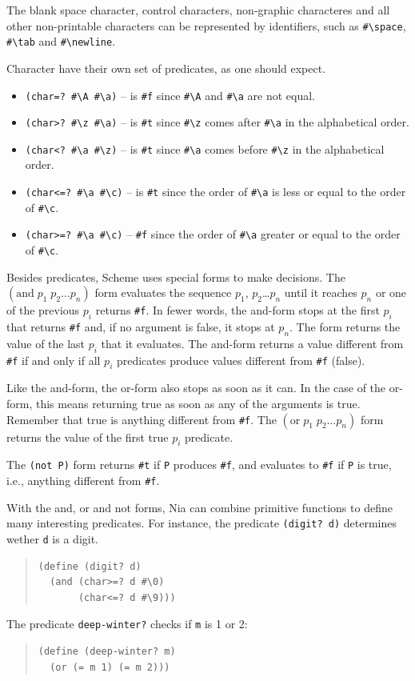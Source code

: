 \documentclass[a4paper,12pt]{book}
\begin{document}
The blank space character,  control
characters, non-graphic characteres
and all other non-printable characters
can be represented by
 identifiers, such as \verb|#\space|,
 \verb|#\tab| and \verb|#\newline|.

 Character have their own set of
 predicates, as one should expect.
\begin{itemize}
\item\verb|(char=? #\A #\a)| -- is \verb|#f|
  since \verb|#\A| and \verb|#\a| are not equal.
\item\verb|(char>? #\z #\a)| -- is \verb|#t|
  since \verb|#\z|  comes
  after \verb|#\a| in the alphabetical order.
\item\verb|(char<? #\a #\z)| -- is \verb|#t|
  since \verb|#\a| comes before \verb|#\z|
  in the alphabetical order.
\item\verb|(char<=? #\a #\c)| -- is \verb|#t| since
  the order of \verb|#\a| is less or equal to
  the order of \verb|#\c|.
\item\verb|(char>=? #\a #\c)| -- \verb|#f| since
  the order of \verb|#\a| greater or equal to the
  order of \verb|#\c|.
\end{itemize}

Besides predicates, Scheme uses special forms
to make decisions. The $(\textrm{and}\; p_1\;
p_2\ldots p_n)$ form
evaluates the sequence $p_1$, $p_2$\ldots $p_n$
until it reaches $p_n$ or one of the previous
$p_i$ returns \verb|#f|. In fewer words,
the and-form stops at the first
$p_i$ that returns \verb|#f| and, if no
argument is false, it stops at $p_n$.
The form returns the value of the last
$p_i$ that it evaluates. The and-form
returns a value different from \verb|#f|
if and only if all $p_i$ predicates produce
values different from \verb|#f| (false).

Like the and-form, the or-form also stops
as soon as it can. In the case of the or-form,
this means returning true as soon as any
of the arguments is true. Remember that
true is anything different from \verb|#f|.
The  $(\textrm{or}\; p_1\;
p_2\ldots p_n)$ form returns the value
of the first true $p_i$ predicate.

The \verb|(not P)| form returns \verb|#t|
if \verb|P| produces \verb|#f|, and
evaluates to \verb|#f| if \verb|P| is true,
i.e., anything different from \verb|#f|.

With the and, or and not forms, Nia can
combine primitive functions to define
many interesting predicates. For instance,
the predicate \verb|(digit? d)| determines
wether \verb|d| is a digit.
\begin{quote}
\begin{verbatim}
(define (digit? d)
  (and (char>=? d #\0)
       (char<=? d #\9)))
\end{verbatim}
\end{quote}
The predicate \verb|deep-winter?| checks if
\verb|m| is 1 or 2:
\begin{quote}
\begin{verbatim}
(define (deep-winter? m)
  (or (= m 1) (= m 2)))
\end{verbatim}
\end{quote}
\end{document}
